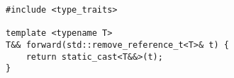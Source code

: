 \begin{lstlisting}[title=\href{https://godbolt.org/z/k997Zh}{\texttt{godbolt.org/z/k997Zh}}]
#include <type_traits>

template <typename T>
T&& forward(std::remove_reference_t<T>& t) {
    return static_cast<T&&>(t);
}
\end{lstlisting}
